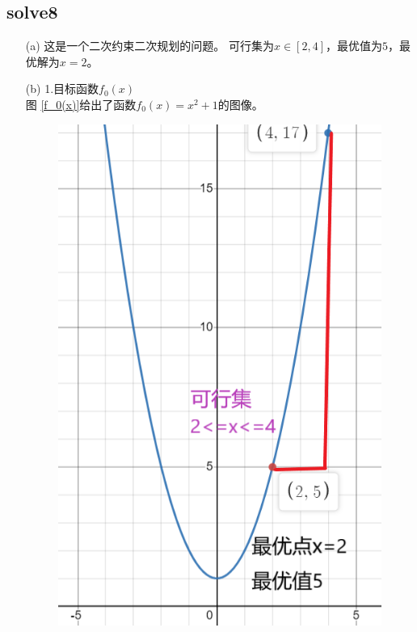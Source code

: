 \documentclass[12pt,a4paper]{ctexart}
\begin{document}
\subsection*{solve8}
\begin{itemize}
    \item[(a)] 这是一个二次约束二次规划的问题。
    可行集为$x \in [2,4]$，最优值为$5$，最优解为$x=2$。
    \item[(b)]
    1.目标函数$f_0(x)$\\
    图 \ref{f_0(x)}给出了函数$f_0(x)=x^2+1$的图像。\\
    \begin{figure}[!h] %
        \centering %
        \includegraphics[scale=0.5]{f_0(x).png} %

\end{figure}
\end{itemize}
\end{document}

